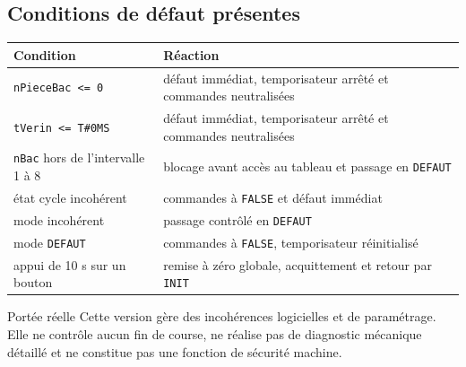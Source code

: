 \begin{minipage}[t]{0.605\textwidth}\vspace{0pt}
  \subsection{Conditions de défaut présentes}
  \begin{tabularx}{\linewidth}{@{}L{37mm}Y@{}}
    \toprule
    \textbf{Condition} & \textbf{Réaction}\\
    \midrule
    \texttt{nPieceBac <= 0} & défaut immédiat, temporisateur arrêté et commandes neutralisées\\
    \texttt{tVerin <= T\#0MS} & défaut immédiat, temporisateur arrêté et commandes neutralisées\\
    \texttt{nBac} hors de l'intervalle 1 à 8 & blocage avant accès au tableau et passage en \texttt{DEFAUT}\\
    état cycle incohérent & commandes à \texttt{FALSE} et défaut immédiat\\
    mode incohérent & passage contrôlé en \texttt{DEFAUT}\\
    mode \texttt{DEFAUT} & commandes à \texttt{FALSE}, temporisateur réinitialisé\\
    appui de 10 s sur un bouton & remise à zéro globale, acquittement et retour par \texttt{INIT}\\
    \bottomrule
  \end{tabularx}

  \vspace{3mm}
  \begin{center}
  \end{center}

  \begin{notebox}[colback=ekinfo,colframe=blue!25]{Portée réelle}
    Cette version gère des incohérences logicielles et de paramétrage. Elle ne contrôle aucun fin de course, ne réalise pas de diagnostic mécanique détaillé et ne constitue pas une fonction de sécurité machine.
  \end{notebox}
\end{minipage}

\newpage

